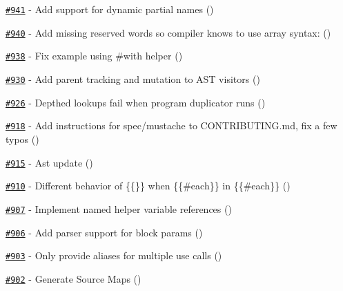\begin{DoxyItemize}
\item \href{https://github.com/wycats/handlebars.js/pull/941}{\tt \#941} -\/ Add support for dynamic partial names (\href{https://api.github.com/users/kpdecker}{\tt })
\item \href{https://github.com/wycats/handlebars.js/pull/940}{\tt \#940} -\/ Add missing reserved words so compiler knows to use array syntax\+: (\href{https://api.github.com/users/mattflaschen}{\tt })
\item \href{https://github.com/wycats/handlebars.js/pull/938}{\tt \#938} -\/ Fix example using \#with helper (\href{https://api.github.com/users/diwo}{\tt })
\item \href{https://github.com/wycats/handlebars.js/pull/930}{\tt \#930} -\/ Add parent tracking and mutation to A\+S\+T visitors (\href{https://api.github.com/users/kpdecker}{\tt })
\item \href{https://github.com/wycats/handlebars.js/issues/926}{\tt \#926} -\/ Depthed lookups fail when program duplicator runs (\href{https://api.github.com/users/kpdecker}{\tt })
\item \href{https://github.com/wycats/handlebars.js/pull/918}{\tt \#918} -\/ Add instructions for \textquotesingle{}spec/mustache\textquotesingle{} to C\+O\+N\+T\+R\+I\+B\+U\+T\+I\+N\+G.\+md, fix a few typos (\href{https://api.github.com/users/oneeman}{\tt })
\item \href{https://github.com/wycats/handlebars.js/pull/915}{\tt \#915} -\/ Ast update (\href{https://api.github.com/users/kpdecker}{\tt })
\item \href{https://github.com/wycats/handlebars.js/issues/910}{\tt \#910} -\/ Different behavior of \{\{\}\} when \{\{\#each\}\} in \{\{\#each\}\} (\href{https://api.github.com/users/zordius}{\tt })
\item \href{https://github.com/wycats/handlebars.js/issues/907}{\tt \#907} -\/ Implement named helper variable references (\href{https://api.github.com/users/kpdecker}{\tt })
\item \href{https://github.com/wycats/handlebars.js/pull/906}{\tt \#906} -\/ Add parser support for block params (\href{https://api.github.com/users/mmun}{\tt })
\item \href{https://github.com/wycats/handlebars.js/issues/903}{\tt \#903} -\/ Only provide aliases for multiple use calls (\href{https://api.github.com/users/kpdecker}{\tt })
\item \href{https://github.com/wycats/handlebars.js/pull/902}{\tt \#902} -\/ Generate Source Maps (\href{https://api.github.com/users/kpdecker}{\tt })

\end{DoxyItemize}
